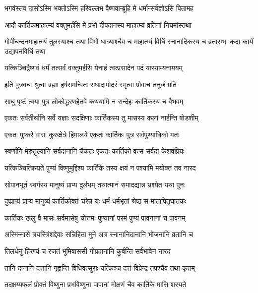 \twolineshloka
{भगवंस्तव दासोऽस्मि भक्तोऽस्मि हरिवल्लभ}
{वैष्णवान्ब्रूहि मे धर्मान्सर्वज्ञोऽसि पितामह} %

\twolineshloka
{आदौ कार्तिकमाहात्म्यं वक्तुमर्हसि मे प्रभो}
{दीपदानस्य माहात्म्यं व्रतिनां नियमांस्तथा} %

\threelineshloka
{गोपीचन्दनमाहात्म्यं तुलस्याश्च तथा विभो}
{धात्र्याश्चैव च माहात्म्यं विधिं स्नानादिकस्य च}
{व्रतारम्भः कदा कार्यं उद्यापनविधिं तथा} %

\twolineshloka
{यत्किञ्चिद्वैष्णवं धर्मं तत्सर्वं वक्तुमर्हसि}
{येनाहं त्वत्प्रसादेन पदं यास्याम्यनामयम्} %


\twolineshloka
{इति पुत्रवचः श्रुत्वा ब्रह्मा हर्षसमन्वितः}
{राधादामोदरं स्मृत्वा प्रोवाच तनुजं प्रति} %


\twolineshloka
{साधु पृष्टं त्वया पुत्र लोकोद्धरणहेतवे}
{कथयामि न सन्देहः कार्तिकस्य च वैभवम्} %

\twolineshloka
{एकतः सर्वतीर्थानि सर्वे यज्ञाः सदक्षिणाः}
{कार्तिकस्य तु मासस्य कलां नार्हन्ति षोडशीम्} %

\twolineshloka
{एकतः पुष्करे वासः कुरुक्षेत्रे हिमालये}
{एकतः कार्तिकः पुत्र सर्वपुण्याधिको मतः} %

\twolineshloka
{स्वर्णानि मेरुतुल्यानि सर्वदानानि चैकतः}
{एकतः कार्तिको वत्स सर्वदा केशवप्रियः} %

\twolineshloka
{यत्किञ्चित्क्रियते पुण्यं विष्णुमुद्दिश्य कार्तिके}
{तस्य क्षयं न पश्यामि मयोक्तं तव नारद} %

\twolineshloka
{सोपानभूतं स्वर्गस्य मानुष्यं प्राप्य दुर्लभम्}
{तथात्मानं समादद्यान्न भ्रश्येत यथा पुनः} %

\twolineshloka
{दुष्प्राप्यं प्राप्य मानुष्यं कार्तिकोक्तं चरेन्न यः}
{धर्मं धर्मभृतां श्रेष्ठ स मातापितृघातकः} %

\twolineshloka
{कार्तिकः खलु वै मासः सर्वमासेषु चोत्तमः}
{पुण्यानां परमं पुण्यं पावनानां च पावनम्} %

\twolineshloka
{अस्मिन्मासे त्रयस्त्रिंशद्देवाः सन्निहिता मुने}
{अत्र स्नानानिदानानि भोजनानि व्रतानि च} %

\twolineshloka
{तिलधेनुं हिरण्यं च रजतं भूमिवाससी}
{गोप्रदानानि कुर्वन्ति सर्वभावेन नारद} %

\twolineshloka
{तानि दानानि दत्तानि गृह्णन्ति विधिवत्सुराः}
{यत्किञ्च दत्तं विप्रेन्द्र तपश्चैव तथा कृतम्} %

\twolineshloka
{तदक्षय्यफलं प्रोक्तं विष्णुना प्रभविष्णुना}
{पापानां मोक्षणं चैव कार्तिके मासि शस्यते} %

